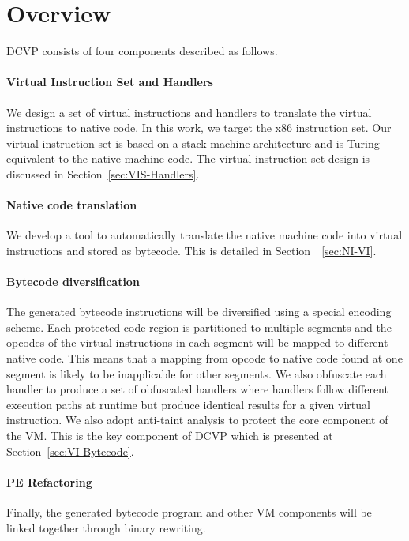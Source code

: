 \section{Overview}\label{sec:overview}
DCVP consists of four components described as follows.

\paragraph{Virtual Instruction Set and Handlers}
We design a set of virtual instructions and handlers to translate the virtual instructions to native code.
In this work, we target the x86 instruction set. Our virtual instruction set is based on a stack machine architecture and is Turing-equivalent to the native machine code.
The virtual instruction set design is discussed in Section~\ref{sec:VIS-Handlers}.

\paragraph{Native code translation}
We develop a tool to automatically translate the native machine code into virtual instructions and stored as bytecode.
This is detailed in Section~~\ref{sec:NI-VI}.

\paragraph{Bytecode diversification}
The generated bytecode instructions will be diversified using a special encoding scheme.
Each protected code region is partitioned to multiple segments and the opcodes of the virtual instructions in each segment will be mapped to different native code.
This means that a mapping from opcode to native code found at one segment is likely to be inapplicable for other segments.
We also obfuscate each handler to produce a set of obfuscated handlers where handlers follow different execution paths at runtime but produce identical results for a given virtual instruction.
We also adopt anti-taint analysis to protect the core component of the VM.
This is the key component of DCVP which is presented at Section~\ref{sec:VI-Bytecode}.

\paragraph{PE Refactoring}
Finally, the generated bytecode program and other VM components will be linked together through binary rewriting.



